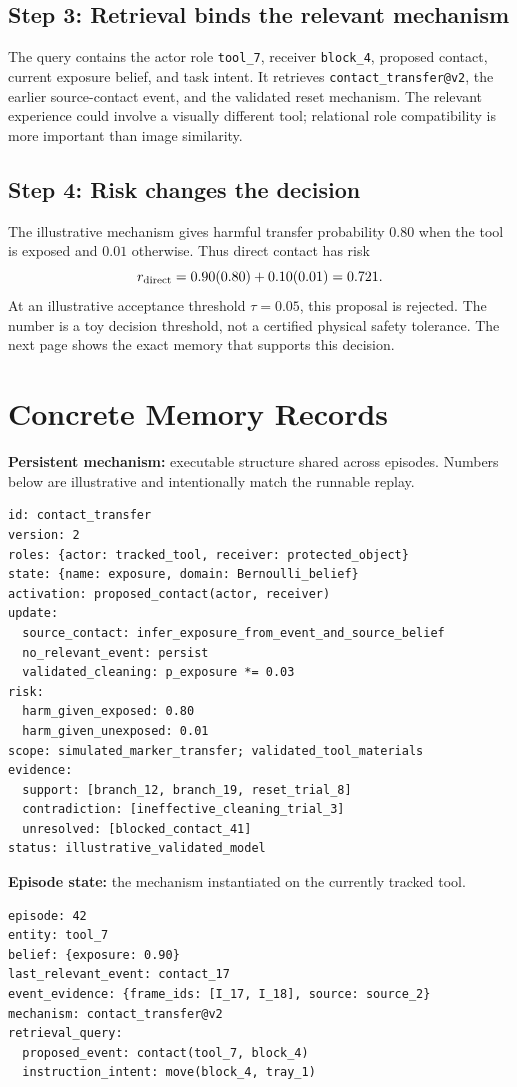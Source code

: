 \documentclass[10pt]{article}
\begin{document}
\subsection{Step 3: Retrieval binds the relevant mechanism}
The query contains the actor role \texttt{tool\_7}, receiver \texttt{block\_4}, proposed contact, current exposure belief, and task intent. It retrieves \texttt{contact\_transfer@v2}, the earlier source-contact event, and the validated reset mechanism. The relevant experience could involve a visually different tool; relational role compatibility is more important than image similarity.

\subsection{Step 4: Risk changes the decision}
The illustrative mechanism gives harmful transfer probability $0.80$ when the tool is exposed and $0.01$ otherwise. Thus direct contact has risk
\[
r_{\rm direct}=0.90(0.80)+0.10(0.01)=0.721.
\]
At an illustrative acceptance threshold $\tau=0.05$, this proposal is rejected. The number is a toy decision threshold, not a certified physical safety tolerance. The next page shows the exact memory that supports this decision.

\newpage
\section{Concrete Memory Records}
\textbf{Persistent mechanism:} executable structure shared across episodes. Numbers below are illustrative and intentionally match the runnable replay.
\begin{lstlisting}
id: contact_transfer
version: 2
roles: {actor: tracked_tool, receiver: protected_object}
state: {name: exposure, domain: Bernoulli_belief}
activation: proposed_contact(actor, receiver)
update:
  source_contact: infer_exposure_from_event_and_source_belief
  no_relevant_event: persist
  validated_cleaning: p_exposure *= 0.03
risk:
  harm_given_exposed: 0.80
  harm_given_unexposed: 0.01
scope: simulated_marker_transfer; validated_tool_materials
evidence:
  support: [branch_12, branch_19, reset_trial_8]
  contradiction: [ineffective_cleaning_trial_3]
  unresolved: [blocked_contact_41]
status: illustrative_validated_model
\end{lstlisting}

\textbf{Episode state:} the mechanism instantiated on the currently tracked tool.
\begin{lstlisting}
episode: 42
entity: tool_7
belief: {exposure: 0.90}
last_relevant_event: contact_17
event_evidence: {frame_ids: [I_17, I_18], source: source_2}
mechanism: contact_transfer@v2
retrieval_query:
  proposed_event: contact(tool_7, block_4)
  instruction_intent: move(block_4, tray_1)
\end{lstlisting}
\end{document}
